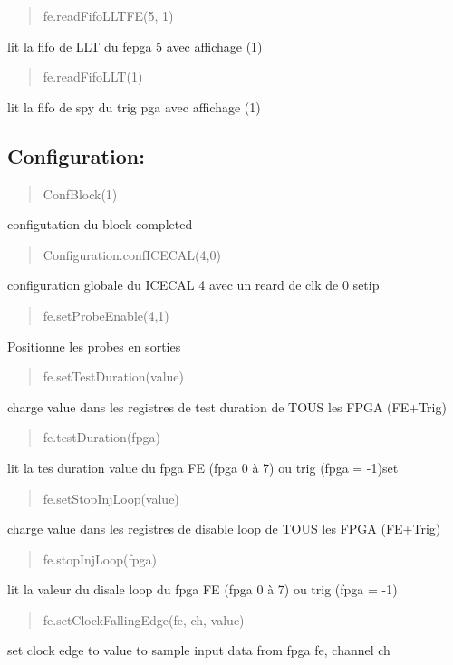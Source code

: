 \begin{quote}
fe.\+read\+Fifo\+L\+L\+T\+F\+E(5, 1) \end{quote}
lit la fifo de L\+LT du fepga 5 avec affichage (1)

\begin{quote}
fe.\+read\+Fifo\+L\+L\+T(1) \end{quote}
lit la fifo de spy du trig pga avec affichage (1)

\subsection*{Configuration\+: }

\begin{quote}
Conf\+Block(1) \end{quote}
configutation du block completed

\begin{quote}
Configuration.\+conf\+I\+C\+E\+C\+A\+L(4,0) \end{quote}
configuration globale du I\+C\+E\+C\+AL 4 avec un reard de clk de 0 setip

\begin{quote}
fe.\+set\+Probe\+Enable(4,1) \end{quote}
Positionne les probes en sorties

\begin{quote}
fe.\+set\+Test\+Duration(value) \end{quote}
charge value dans les registres de test duration de T\+O\+US les F\+P\+GA (F\+E+\+Trig)

\begin{quote}
fe.\+test\+Duration(fpga) \end{quote}
lit la tes duration value du fpga FE (fpga 0 à 7) ou trig (fpga = -\/1)set

\begin{quote}
fe.\+set\+Stop\+Inj\+Loop(value) \end{quote}
charge value dans les registres de disable loop de T\+O\+US les F\+P\+GA (F\+E+\+Trig)

\begin{quote}
fe.\+stop\+Inj\+Loop(fpga) \end{quote}
lit la valeur du disale loop du fpga FE (fpga 0 à 7) ou trig (fpga = -\/1)

\begin{quote}
fe.\+set\+Clock\+Falling\+Edge(fe, ch, value) \end{quote}
set clock edge to value to sample input data from fpga fe, channel ch

